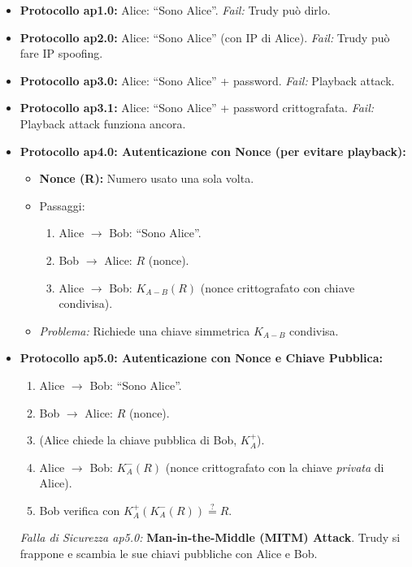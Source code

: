 \begin{itemize}
    \item \textbf{Protocollo ap1.0:} Alice: \textquotedblleft Sono Alice\textquotedblright{}. \textit{Fail:} Trudy può dirlo.
    \item \textbf{Protocollo ap2.0:} Alice: \textquotedblleft Sono Alice\textquotedblright{} (con IP di Alice). \textit{Fail:} Trudy può fare IP spoofing.
    \item \textbf{Protocollo ap3.0:} Alice: \textquotedblleft Sono Alice\textquotedblright{} + password. \textit{Fail:} Playback attack.
    \item \textbf{Protocollo ap3.1:} Alice: \textquotedblleft Sono Alice\textquotedblright{} + password crittografata. \textit{Fail:} Playback attack funziona ancora.
    \item \textbf{Protocollo ap4.0: Autenticazione con Nonce (per evitare playback):}
    \begin{itemize}
        \item \textbf{Nonce (R):} Numero usato una sola volta.
        \item Passaggi:
        \begin{enumerate}
            \item Alice $\rightarrow$ Bob: \textquotedblleft Sono Alice\textquotedblright{}.
            \item Bob $\rightarrow$ Alice: $R$ (nonce).
            \item Alice $\rightarrow$ Bob: $K_{A-B}(R)$ (nonce crittografato con chiave condivisa).
        \end{enumerate}
        \item \textit{Problema:} Richiede una chiave simmetrica $K_{A-B}$ condivisa.
    \end{itemize}
    \item \textbf{Protocollo ap5.0: Autenticazione con Nonce e Chiave Pubblica:}
    \begin{enumerate}
        \item Alice $\rightarrow$ Bob: \textquotedblleft Sono Alice\textquotedblright{}.
        \item Bob $\rightarrow$ Alice: $R$ (nonce).
        \item (Alice chiede la chiave pubblica di Bob, $K_A^+$).
        \item Alice $\rightarrow$ Bob: $K_A^-(R)$ (nonce crittografato con la chiave \textit{privata} di Alice).
        \item Bob verifica con $K_A^+(K_A^-(R)) \stackrel{?}{=} R$.
    \end{enumerate}
    \textit{Falla di Sicurezza ap5.0:} \textbf{Man-in-the-Middle (MITM) Attack}. Trudy si frappone e scambia le sue chiavi pubbliche con Alice e Bob.
\end{itemize}

